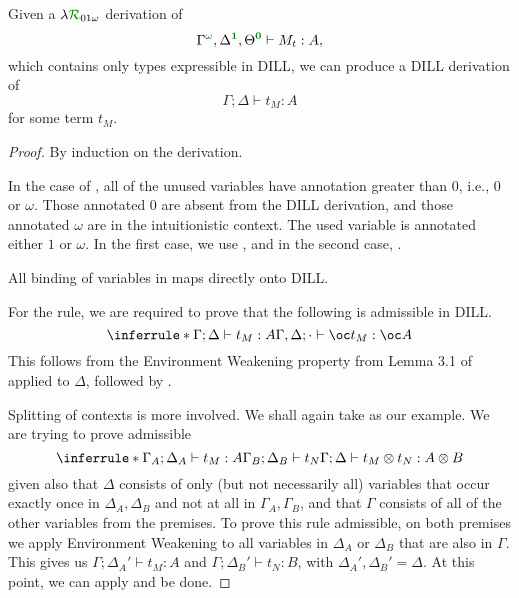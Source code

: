 \begin{proposition}
  Given a $\name_{01\omega}$ derivation of \[
    \ctx{\Gamma}{\vct \omega}, \ctx{\Delta}{\vct 1}, \ctx{\Theta}{\vct 0} \vdash
    M_t : A,
  \] which contains only types expressible in DILL, we can produce a DILL
  derivation of \[
    \Gamma; \Delta \vdash t_M : A
  \] for some term $t_M$.
\end{proposition}
\begin{proof}
  By induction on the derivation.

  In the case of , all of the unused variables have annotation
  greater than $0$, i.e., $0$ or $\omega$.
  Those annotated $0$ are absent from the DILL derivation, and those annotated
  $\omega$ are in the intuitionistic context.
  The used variable is annotated either $1$ or $\omega$.
  In the first case, we use , and in the second case,
  .

  All binding of variables in \name{} maps directly onto DILL.

  For the  rule, we are required to prove that the
  following is admissible in DILL.
  \[
    \inferrule*
    {\Gamma; \Delta \vdash t_M : A}
    {\Gamma, \Delta; \cdot \vdash \oc t_M : \oc A}
  \]
  This follows from the Environment Weakening property from Lemma 3.1 of
  \cite{Barber1996} applied to $\Delta$, followed by .

  Splitting of contexts is more involved.
  We shall again take  as our example.
  We are trying to prove admissible \[
    \inferrule*
    {\Gamma_A; \Delta_A \vdash t_M : A \\ \Gamma_B; \Delta_B \vdash t_N}
    {\Gamma; \Delta \vdash t_M \otimes t_N : A \otimes B}
  \] given also that $\Delta$ consists of only (but not necessarily all)
  variables that occur exactly once in $\Delta_A, \Delta_B$ and not at all in
  $\Gamma_A, \Gamma_B$, and that $\Gamma$ consists of all of the other variables
  from the premises.
  To prove this rule admissible, on both premises we apply Environment Weakening
  to all variables in $\Delta_A$ or $\Delta_B$ that are also in $\Gamma$.
  This gives us $\Gamma; \Delta_A' \vdash t_M : A$ and $\Gamma; \Delta_B' \vdash
  t_N : B$, with $\Delta_A', \Delta_B' = \Delta$.
  At this point, we can apply  and be done.
\end{proof}